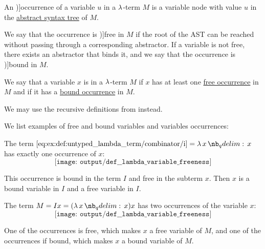 \begin{definition}\label{def:lambda_variable_occurrence}\mimprovised
  An \term[ru=вхождение (\cite[64]{Герасимов2011})]{occurrence} of a variable \( u \) in a \( \mathrm{\lambda} \)-term \( M \) is a variable node with value \( u \) in the \hyperref[def:untyped_lambda_term_ast]{abstract syntax tree} of \( M \).

  We say that the occurrence is \term[ru=свободное (вхождение) (\cite[64]{Герасимов2011})]{free} in \( M \) if the root of the AST can be reached without passing through a corresponding abstractor. If a variable is not free, there exists an abstractor that binds it, and we say that the occurrence is \term[ru=связанное (вхождение) (\cite[64]{Герасимов2011})]{bound} in \( M \).
\end{definition}

\begin{definition}\label{def:lambda_variable_freeness}\mimprovised
  We say that a variable \( x \) is  in a \( \mathrm{\lambda} \)-term \( M \) if \( x \) has at least one \hyperref[def:lambda_variable_occurrence]{free occurrence} in \( M \) and  if it has a \hyperref[def:lambda_variable_occurrence]{bound occurrence} in \( M \).
\end{definition}
\begin{comments}
  \item We may use the recursive definitions from  instead.
\end{comments}

\begin{example}\label{ex:def:lambda_variable_freeness}
  We list examples of free and bound variables and variables occurrences:
  \begin{thmenum}
     The term \( \ref{eq:ex:def:untyped_lambda_term/combinator/i} = \qabs x x \) has exactly one occurrence of \( x \):
    \begin{equation*}
      \texttt{[image: output/def\_\_lambda\_variable\_freeness]}
    \end{equation*}

     This occurrence is bound in the term \( I \) and free in the subterm \( x \). Then \( x \) is a bound variable in \( I \) and a free variable in \( I \).

     The term \( M = I x = (\qabs x x) x \) has two occurrences of the variable \( x \):
    \begin{equation*}
      \texttt{[image: output/def\_\_lambda\_variable\_freeness]}
    \end{equation*}

    One of the occurrences is free, which makes \( x \) a free variable of \( M \), and one of the occurrences if bound, which makes \( x \) a bound variable of \( M \).
  \end{thmenum}
\end{example}

